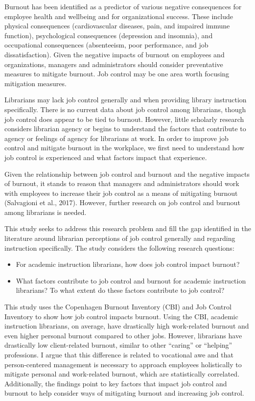 \documentclass[
  twocolumn]{article}
\providecommand{\tightlist}{%
  \setlength{\itemsep}{0pt}\setlength{\parskip}{0pt}}\usepackage{longtable,booktabs,array}
\begin{document}
Burnout has been identified as a predictor of various negative
consequences for employee health and wellbeing and for organizational
success. These include physical consequences (cardiovascular diseases,
pain, and impaired immune function), psychological consequences
(depression and insomnia), and occupational consequences (absenteeism,
poor performance, and job dissatisfaction). Given the negative impacts
of burnout on employees and organizations, managers and administrators
should consider preventative measures to mitigate burnout. Job control
may be one area worth focusing mitigation measures.

Librarians may lack job control generally and when providing library
instruction specifically. There is no current data about job control
among librarians, though job control does appear to be tied to burnout.
However, little scholarly research considers librarian agency or begins
to understand the factors that contribute to agency or feelings of
agency for librarians at work. In order to improve job control and
mitigate burnout in the workplace, we first need to understand how job
control is experienced and what factors impact that experience.

Given the relationship between job control and burnout and the negative
impacts of burnout, it stands to reason that managers and administrators
should work with employees to increase their job control as a means of
mitigating burnout (Salvagioni et al., 2017). However, further research
on job control and burnout among librarians is needed.

This study seeks to address this research problem and fill the gap
identified in the literature around librarian perceptions of job control
generally and regarding instruction specifically. The study considers
the following research questions:

\begin{itemize}
\tightlist
\item
  For academic instruction librarians, how does job control impact
  burnout?
\item
  What factors contribute to job control and burnout for academic
  instruction librarians? To what extent do these factors contribute to
  job control?
\end{itemize}

This study uses the Copenhagen Burnout Inventory (CBI) and Job Control
Inventory to show how job control impacts burnout. Using the CBI,
academic instruction librarians, on average, have drastically high
work-related burnout and even higher personal burnout compared to other
jobs. However, librarians have drastically low client-related burnout,
similar to other ``caring'' or ``helping'' professions. I argue that
this difference is related to vocational awe and that person-centered
management is necessary to approach employees holistically to mitigate
personal and work-related burnout, which are statistically correlated.
Additionally, the findings point to key factors that impact job control
and burnout to help consider ways of mitigating burnout and increasing
job control.
\end{document}
